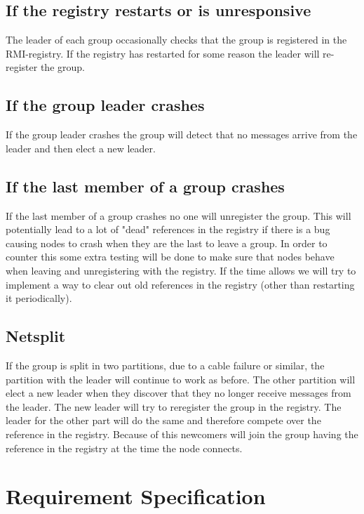 \documentclass[english]{article}
\begin{document}
\subsection{If the registry restarts or is unresponsive}
The leader of each group occasionally checks that the group is registered in the RMI-registry. If the registry has restarted for some reason the leader will re-register the group.

\subsection{If the group leader crashes}
If the group leader crashes the group will detect that no messages arrive from the leader and then elect a new leader. 

\subsection{If the last member of a group crashes}
If the last member of a group crashes no one will unregister the group.
This will potentially lead to a lot of "dead" references in the registry if there is a bug causing nodes to crash when they are the last to leave a group. In order to counter this some extra testing will be done to make sure that nodes behave when leaving and unregistering with the registry.
If the time allows we will try to implement a way to clear out old references in the registry (other than restarting it periodically).

\subsection{Netsplit}
If the group is split in two partitions, due to a cable failure or similar, the partition with the leader will continue to work as before. The other partition will elect a new leader when they discover that they no longer receive messages from the leader.
The new leader will try to reregister the group in the registry. The leader for the other part will do the same and therefore compete over the reference in the registry. Because of this newcomers will join the group having the reference in the registry at the time the node connects.

\section{Requirement Specification}
\end{document}
